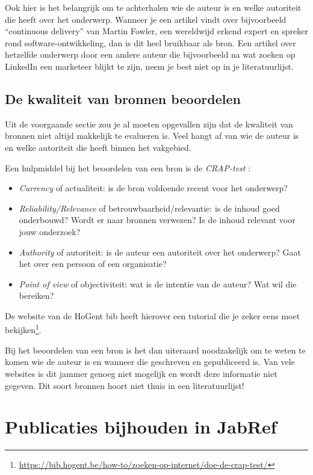 Ook hier is het belangrijk om te achterhalen wie de auteur is en welke autoriteit die heeft over het onderwerp. Wanneer je een artikel vindt over bijvoorbeeld ``continuous delivery'' van Martin Fowler, een wereldwijd erkend expert en spreker rond software-ontwikkeling, dan is dit heel bruikbaar als bron. Een artikel over hetzelfde onderwerp door een andere auteur die bijvoorbeeld na wat zoeken op LinkedIn een marketeer blijkt te zijn, neem je best niet op in je literatuurlijst.

\subsection{De kwaliteit van bronnen beoordelen}
\label{sub:de-kwaliteit-van-bronnen-beoordelen}

Uit de voorgaande sectie zou je al moeten opgevallen zijn dat de kwaliteit van bronnen niet altijd makkelijk te evalueren is. Veel hangt af van wie de auteur is en welke autoriteit die heeft binnen het vakgebied.

Een hulpmiddel bij het beoordelen van een bron is de \emph{CRAP-test} \autocite{Gratz2015}:

\begin{itemize}
  \item \emph{Currency} of actualiteit: is de bron voldoende recent voor het onderwerp?
  \item \emph{Reliability/Relevance} of betrouwbaarheid/relevantie: is de inhoud goed onderbouwd? Wordt er naar bronnen verwezen? Is de inhoud relevant voor jouw onderzoek?
  \item \emph{Authority} of autoriteit: is de auteur een autoriteit over het onderwerp? Gaat het over een persoon of een organisatie?
  \item \emph{Point of view} of objectiviteit: wat is de intentie van de auteur? Wat wil die bereiken?
\end{itemize}

De website van de HoGent bib heeft hierover een tutorial die je zeker eens moet bekijken\footnote{\url{https://bib.hogent.be/how-to/zoeken-op-internet/doe-de-crap-test/}}.

Bij het beoordelen van een bron is het dan uiteraard noodzakelijk om te weten te komen wie de auteur is en wanneer die geschreven en gepubliceerd is. Van vele websites is dit jammer genoeg niet mogelijk en wordt deze informatie niet gegeven. Dit soort bronnen hoort niet thuis in een literatuurlijst!

\section{Publicaties bijhouden in JabRef}
\label{sec:publicaties_bijhouden_in_jabref}

